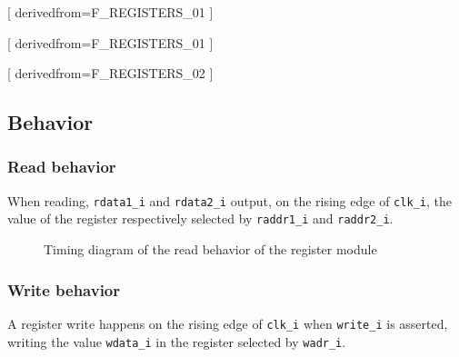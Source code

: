       [
          derivedfrom=F\_REGISTERS\_01
        ]

      [
          derivedfrom=F\_REGISTERS\_01
        ]

      [
          derivedfrom=F\_REGISTERS\_02
        ]

  \subsection{Behavior}

    \subsubsection{Read behavior}

      \begin{content}
          When reading, \texttt{rdata1\_i} and \texttt{rdata2\_i} output, on the rising edge of \texttt{clk\_i}, the value of the register respectively selected by \texttt{raddr1\_i} and \texttt{raddr2\_i}.
        \end{content}

      \begin{figure}[H]
          \centering
          
          \caption{Timing diagram of the read behavior of the register module}
          \label{fig:regm-behavior-read}
        \end{figure}

    \subsubsection{Write behavior}

      \begin{content}
          A register write happens on the rising edge of \texttt{clk\_i} when \texttt{write\_i} is asserted, writing the value \texttt{wdata\_i} in the register selected by \texttt{wadr\_i}.
        \end{content}

